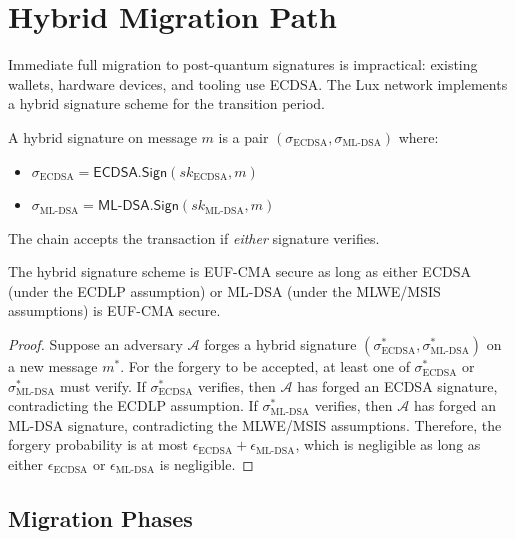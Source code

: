 \section{Hybrid Migration Path}

\label{sec:hybrid}

Immediate full migration to post-quantum signatures is impractical:
existing wallets, hardware devices, and tooling use ECDSA.  The Lux
network implements a hybrid signature scheme for the transition period.

\begin{definition}
A hybrid signature on message $m$ is a pair
$(\sigma_{\text{ECDSA}}, \sigma_{\text{ML-DSA}})$ where:
\begin{itemize}[nosep]
  \item $\sigma_{\text{ECDSA}} = \mathsf{ECDSA.Sign}(sk_{\text{ECDSA}}, m)$
  \item $\sigma_{\text{ML-DSA}} = \mathsf{ML\text{-}DSA.Sign}(sk_{\text{ML-DSA}}, m)$
\end{itemize}
The chain accepts the transaction if \emph{either} signature verifies.
\end{definition}

\begin{theorem}
\label{thm:hybrid}
The hybrid signature scheme is EUF-CMA secure as long as either
ECDSA (under the ECDLP assumption) or ML-DSA (under the MLWE/MSIS
assumptions) is EUF-CMA secure.
\end{theorem}

\begin{proof}
Suppose an adversary $\mathcal{A}$ forges a hybrid signature
$(\sigma^*_{\text{ECDSA}}, \sigma^*_{\text{ML-DSA}})$ on a new message
$m^*$.  For the forgery to be accepted, at least one of
$\sigma^*_{\text{ECDSA}}$ or $\sigma^*_{\text{ML-DSA}}$ must verify.
If $\sigma^*_{\text{ECDSA}}$ verifies, then $\mathcal{A}$ has forged an
ECDSA signature, contradicting the ECDLP assumption.  If
$\sigma^*_{\text{ML-DSA}}$ verifies, then $\mathcal{A}$ has forged an
ML-DSA signature, contradicting the MLWE/MSIS assumptions.  Therefore,
the forgery probability is at most
$\epsilon_{\text{ECDSA}} + \epsilon_{\text{ML-DSA}}$, which is
negligible as long as either $\epsilon_{\text{ECDSA}}$ or
$\epsilon_{\text{ML-DSA}}$ is negligible.
\end{proof}

\subsection{Migration Phases}

